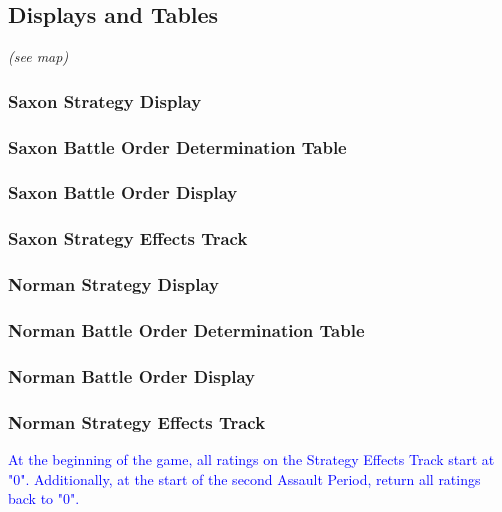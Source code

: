 \subsection{Displays and Tables} \textit{(see map)}

\subsubsection{Saxon Strategy Display}

\subsubsection{Saxon Battle Order Determination Table}

\subsubsection{Saxon Battle Order Display}

\subsubsection{Saxon Strategy Effects Track}

\subsubsection{Norman Strategy Display}

\subsubsection{Norman Battle Order Determination Table}

\subsubsection{Norman Battle Order Display}

\subsubsection{Norman Strategy Effects Track}
\hfill

\textcolor{blue}{At the beginning of the game, all ratings on the Strategy Effects Track start at "0". Additionally, at the start of the second Assault Period, return all ratings back to "0".}
